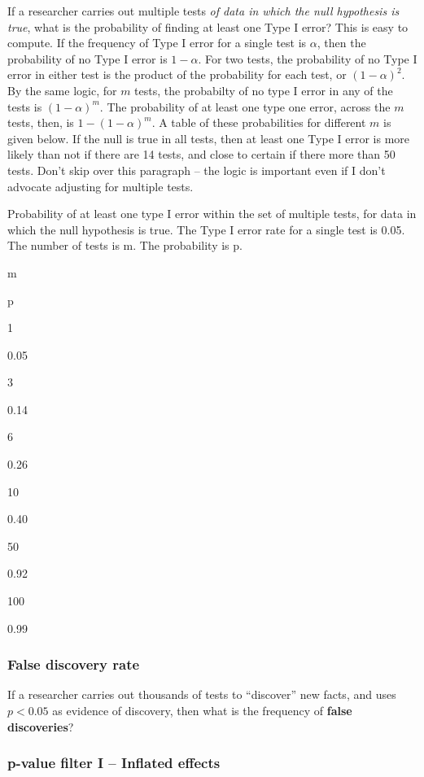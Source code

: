 \documentclass[]{book}
\begin{document}
If a researcher carries out multiple tests \emph{of data in which the
null hypothesis is true}, what is the probability of finding at least
one Type I error? This is easy to compute. If the frequency of Type I
error for a single test is \(\alpha\), then the probability of no Type I
error is \(1 - \alpha\). For two tests, the probability of no Type I
error in either test is the product of the probability for each test, or
\((1 - \alpha)^2\). By the same logic, for \(m\) tests, the probabilty
of no type I error in any of the tests is \((1 - \alpha)^m\). The
probability of at least one type one error, across the \(m\) tests,
then, is \(1 - (1 - \alpha)^m\). A table of these probabilities for
different \(m\) is given below. If the null is true in all tests, then
at least one Type I error is more likely than not if there are 14 tests,
and close to certain if there more than 50 tests. Don't skip over this
paragraph -- the logic is important even if I don't advocate adjusting
for multiple tests.

\label{tab:best-type1-table}Probability of at least one type I error within
the set of multiple tests, for data in which the null hypothesis is
true. The Type I error rate for a single test is 0.05. The number of
tests is m. The probability is p.

m

p

1

0.05

3

0.14

6

0.26

10

0.40

50

0.92

100

0.99

\subsubsection{False discovery rate}\label{false-discovery-rate}

If a researcher carries out thousands of tests to ``discover'' new
facts, and uses \(p < 0.05\) as evidence of discovery, then what is the
frequency of \textbf{false discoveries}?

\subsubsection{p-value filter I -- Inflated
effects}\label{p-value-filter-i-inflated-effects}
\end{document}
